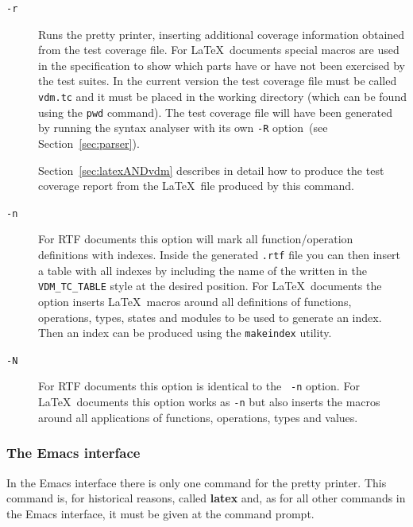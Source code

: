 \documentclass[\pformat,12pt]{article}
\begin{document}
\begin{description}

\item[{\tt -r}] Runs the pretty printer, inserting additional coverage
  information obtained from the test coverage file. For \LaTeX\ 
  documents special macros are used in the specification to show which
  parts have or have not been exercised by the test suites.  In the
  current version the test coverage file\index{Test Coverage!File}
  must be called {\tt vdm.tc} 
  and it must be placed in the working directory (which can be found
  using the \texttt{pwd} command). The test
  coverage file will have been generated by running the syntax
  analyser with its own {\tt -R} option~(see Section~\ref{sec:parser}).
  
  Section~\ref{sec:latexANDvdm} describes in detail how to produce the
  test coverage report from the \LaTeX\ file produced by this command.

\item[{\tt -n}] For RTF documents this option will mark all
  function/operation definitions with indexes. Inside the generated
  {\tt .rtf} file you can then insert a table with all indexes by
  including the name of the
   written in the
  \texttt{VDM\_TC\_TABLE} style at the desired position.
  For \LaTeX\ documents the option inserts \LaTeX\ 
  macros around all definitions of functions, operations, types,
  states and modules to be used to generate an index.  Then an
  index can be produced using the {\tt makeindex} utility.

\item[{\tt -N}] For RTF documents this option is identical to the {\tt
    -n} option. For \LaTeX\ documents this option works as {\tt -n}
  but also inserts the macros around all applications of functions,
  operations, types and values. 


\end{description}

\subsubsection{The Emacs interface}

In the Emacs interface there is only one command for the pretty
printer. This command is, for historical reasons, called \textbf{latex}
and, as for all other commands in the Emacs interface, it must be given at
the command prompt.
\end{document}
